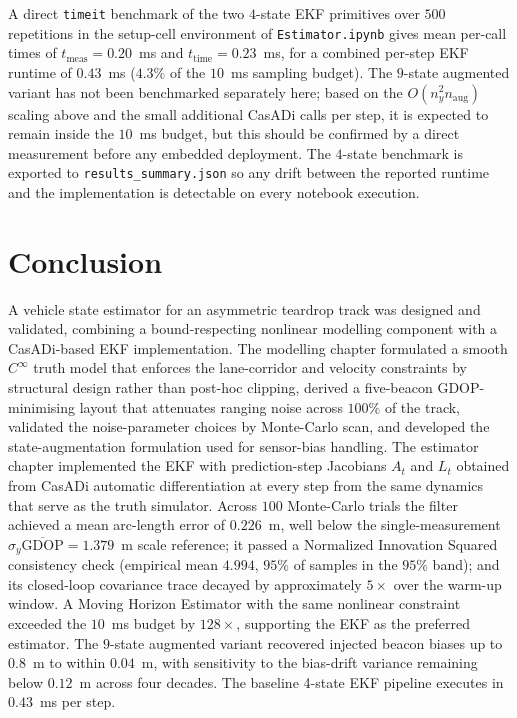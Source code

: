 \documentclass[11pt,a4paper]{article}
\newcommand{\code}[1]{\texttt{#1}}
\begin{document}
A direct \texttt{timeit} benchmark of the two $4$-state EKF
primitives over $500$ repetitions in the setup-cell environment of
\code{Estimator.ipynb} gives mean per-call times of
$t_{\text{meas}}=0.20$~ms and $t_{\text{time}}=0.23$~ms, for a
combined per-step EKF runtime of $0.43$~ms ($4.3\%$ of the $10$~ms
sampling budget). The $9$-state augmented variant has not been
benchmarked separately here; based on the $O(n_y^2 n_\text{aug})$
scaling above and the small additional CasADi calls per step, it is
expected to remain inside the $10$~ms budget, but this should be
confirmed by a direct measurement before any embedded deployment.
The $4$-state benchmark is exported to \code{results\_summary.json}
so any drift between the reported runtime and the implementation is
detectable on every notebook execution.

\FloatBarrier
\section{Conclusion}
\label{sec:conclusion}

A vehicle state estimator for an asymmetric teardrop track was
designed and validated, combining a bound-respecting nonlinear
modelling component with a CasADi-based EKF implementation. The
modelling chapter formulated a smooth $C^{\infty}$ truth model that
enforces the lane-corridor and velocity constraints by structural
design rather than post-hoc clipping, derived a five-beacon
GDOP-minimising layout that attenuates ranging noise across $100\%$
of the track, validated the noise-parameter choices by Monte-Carlo
scan, and developed the state-augmentation formulation used for
sensor-bias handling. The estimator chapter implemented the EKF with
prediction-step Jacobians $A_t$ and $L_t$ obtained from CasADi
automatic differentiation at every step from the same dynamics that
serve as the truth simulator. Across $100$ Monte-Carlo trials the
filter achieved a mean arc-length error of $0.226$~m, well below the
single-measurement $\sigma_y\overline{\mathrm{GDOP}}=1.379$~m scale
reference; it passed a Normalized Innovation Squared consistency
check (empirical
mean $4.994$, $95\%$ of samples in the $95\%$ band); and its
closed-loop covariance trace decayed by approximately $5\times$ over
the warm-up window. A Moving Horizon Estimator with the same
nonlinear constraint exceeded the $10$~ms budget by $128\times$,
supporting the EKF as the preferred estimator. The $9$-state
augmented variant recovered injected beacon biases up to $0.8$~m to
within $0.04$~m, with sensitivity to the bias-drift variance
remaining below $0.12$~m across four decades. The baseline 4-state EKF
pipeline executes in $0.43$~ms per step.
\end{document}
